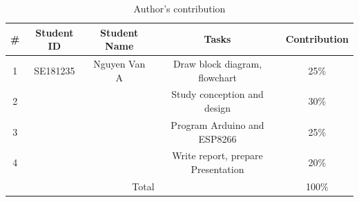 \documentclass[conference, onecolumn]{IEEEtran}
\begin{document}
\begin{table}
    \centering
\caption{Author's contribution}
\label{tab:my_label}
    \begin{tabular}{|c|c|c|c|c|}
    \hline
         \#&  Student ID &  Student Name &  Tasks & Contribution\\
         \hline
         1&  SE181235&  Nguyen Van A&  Draw block diagram, flowchart& 25\%\\
         \hline
         2&  &  &  Study conception and design& 30\%\\
         \hline
         3&  &  &  Program Arduino and ESP8266& 25\%\\
         \hline
         4&  &  &  Write report, prepare Presentation & 20\%\\
         \hline
         \multicolumn{4}{|c|}{Total}& 100\%\\
         \hline
    \end{tabular}    
\end{table}


\end{document}

